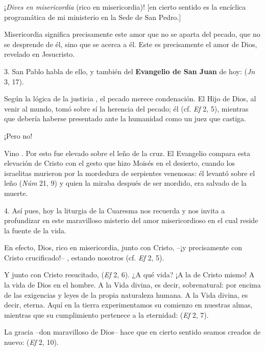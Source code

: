 \begin{body}
¡\textit{Dives en misericordia} (rico en misericordia)! [en cierto sentido es la encíclica programática de mi ministerio en la Sede de San Pedro.]

Misericordia significa precisamente este amor que no se aparta del pecado, que no se desprende de él, sino que se acerca a él. Este es precisamente el amor de Dios, revelado en Jesucristo.

3. San Pablo habla de ello, y también del \textbf{Evangelio de San Juan} de hoy:  (\textit{Jn} 3, 17).

Según la lógica de la justicia , el pecado merece condenación. El Hijo de Dios, al venir al mundo, tomó sobre sí la herencia del pecado; él  (cf. \textit{Ef} 2, 5), mientras que debería haberse presentado ante la humanidad como un juez que castiga.

¡Pero no!

Vino . Por esto fue elevado sobre el leño de la cruz. El Evangelio compara esta elevación de Cristo con el gesto que hizo Moisés en el desierto, cuando los israelitas murieron por la mordedura de serpientes venenosas: él levantó sobre el leño  (\textit{Núm} 21, 9) y quien la miraba después de ser mordido, era salvado de la muerte.

4. Así pues, hoy la liturgia de la Cuaresma nos recuerda y nos invita a profundizar en este maravilloso misterio del amor misericordioso en el cual reside la fuente de la vida.

En efecto, Dios, rico en misericordia, junto con Cristo, –¡y precisamente con Cristo crucificado!– , estando nosotros  (cf. \textit{Ef} 2, 5).

Y junto con Cristo resucitado,  (\textit{Ef} 2, 6). ¿A qué vida? ¡A la de Cristo mismo! A la vida de Dios en el hombre. A la Vida divina, es decir, sobrenatural: por encima de las exigencias y leyes de la propia naturaleza humana. A la Vida divina, es decir, eterna. Aquí en la tierra experimentamos su comienzo en nuestras almas, mientras que su cumplimiento pertenece a la eternidad:  (\textit{Ef} 2, 7).

La gracia –don maravilloso de Dios– hace que en cierto sentido seamos creados de nuevo:  (\textit{Ef} 2, 10).


\end{body}
